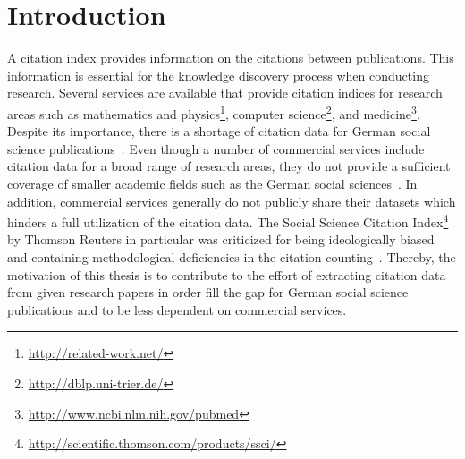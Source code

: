 \chapter{Introduction}\label{cha:introduction}

A citation index provides information on the citations between publications.
This information is essential for the knowledge discovery process when conducting research.
Several services are available that provide citation indices for research areas such as mathematics and physics\footnote{\url{http://related-work.net/}}, computer science\footnote{\url{http://dblp.uni-trier.de/}}, and medicine\footnote{\url{http://www.ncbi.nlm.nih.gov/pubmed}}.
Despite its importance, there is a shortage of citation data for German social science publications~\citep{herb2015open}.
Even though a number of commercial services include citation data for a broad range of research areas, they do not provide a sufficient coverage of smaller academic fields such as the German social sciences~\citep{mayr2007exploratory}.
In addition, commercial services generally do not publicly share their datasets which hinders a full utilization of the citation data.
The Social Science Citation Index\footnote{\url{http://scientific.thomson.com/products/ssci/}} by Thomson Reuters in particular was criticized for being ideologically biased and containing methodological deficiencies in the citation counting~\cite{klein2004social}.
Thereby, the motivation of this thesis is to contribute to the effort of extracting citation data from given research papers in order fill the gap for German social science publications and to be less dependent on commercial services.

\bigskip

